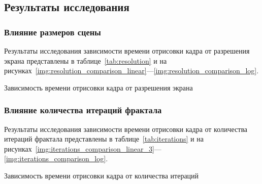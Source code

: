\subsection{Результаты исследования}

\subsubsection{Влияние размеров сцены}

Результаты исследования зависимости времени отрисовки кадра от разрешения экрана представлены в таблице~\ref{tab:resolution} и на рисунках~\ref{img:resolution_comparison_linear}---\ref{img:resolution_comparison_log}.

\begin{table}[h]
  \begin{center}
    \captionsetup{justification=centering, margin=.5cm}
    \caption{Зависимость времени отрисовки кадра от разрешения экрана}\label{tab:resolution}
  \end{center}
\end{table}



\clearpage
\subsubsection{Влияние количества итераций фрактала}

Результаты исследования зависимости времени отрисовки кадра от количества итераций фрактала представлены в таблице~\ref{tab:iterations}
и на рисунках~\ref{img:iterations_comparison_linear_3}---\ref{img:iterations_comparison_log}.

\begin{table}[h]
  \begin{center}
    \captionsetup{justification=centering, margin=.5cm}
    \caption{Зависимость времени отрисовки кадра от количества итераций}\label{tab:iterations}
  \end{center}
\end{table}


